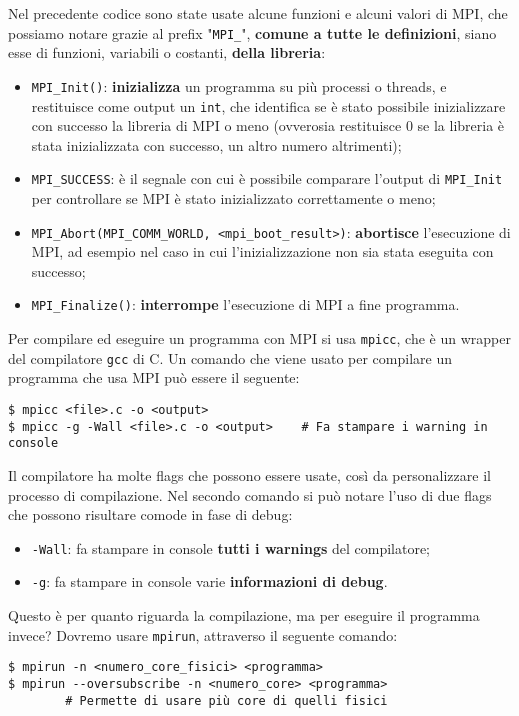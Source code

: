 Nel precedente codice sono state usate alcune funzioni e alcuni valori di MPI, che possiamo notare grazie al prefix "\texttt{MPI\_}", \textbf{comune a tutte le definizioni}, siano esse di funzioni, variabili o costanti, \textbf{della libreria}:
\begin{itemize}
    \item \verb|MPI_Init()|: \textbf{inizializza} un programma su più processi o threads, e restituisce come output un \texttt{int}, che identifica se è stato possibile inizializzare con successo la libreria di MPI o meno (ovverosia restituisce 0 se la libreria è stata inizializzata con successo, un altro numero altrimenti);
    \item \verb|MPI_SUCCESS|: è il segnale con cui è possibile comparare l'output di \verb|MPI_Init| per controllare se MPI è stato inizializzato correttamente o meno;
    \item \verb|MPI_Abort(MPI_COMM_WORLD, <mpi_boot_result>)|: \textbf{abortisce} l'esecuzione di MPI, ad esempio nel caso in cui l'inizializzazione non sia stata eseguita con successo;
    \item \verb|MPI_Finalize()|: \textbf{interrompe} l'esecuzione di MPI a fine programma.
\end{itemize}

Per compilare ed eseguire un programma con MPI si usa \texttt{mpicc}, che è un wrapper del compilatore \texttt{gcc} di C. Un comando che viene usato per compilare un programma che usa MPI può essere il seguente:

\begin{terminal}
    \begin{lstlisting}[style = notexterm]
$ mpicc <file>.c -o <output>
$ mpicc -g -Wall <file>.c -o <output>    # Fa stampare i warning in console\end{lstlisting}
\end{terminal}

Il compilatore ha molte flags che possono essere usate, così da personalizzare il processo di compilazione. Nel secondo comando si può notare l'uso di due flags che possono risultare comode in fase di debug:
\begin{itemize}
    \item \verb|-Wall|: fa stampare in console \textbf{tutti i warnings} del compilatore;
    \item \verb|-g|: fa stampare in console varie \textbf{informazioni di debug}.
\end{itemize}

Questo è per quanto riguarda la compilazione, ma per eseguire il programma invece? Dovremo usare \texttt{mpirun}, attraverso il seguente comando:
\begin{terminal}
    \begin{lstlisting}[style = notexterm]
$ mpirun -n <numero_core_fisici> <programma>
$ mpirun --oversubscribe -n <numero_core> <programma>
        # Permette di usare più core di quelli fisici\end{lstlisting}
\end{terminal}

